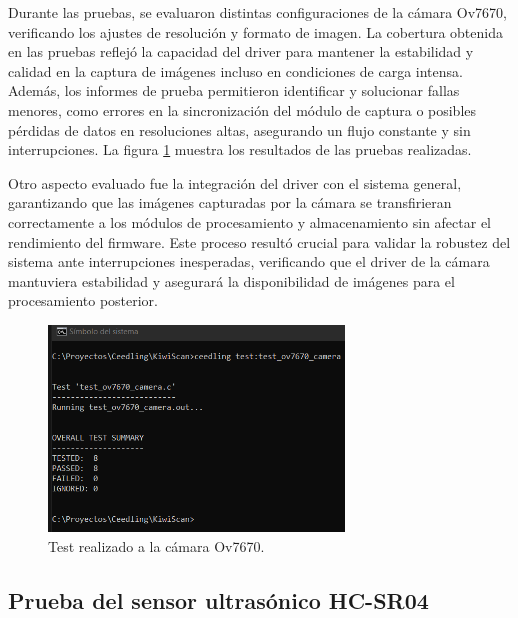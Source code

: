 Durante las pruebas, se evaluaron distintas configuraciones de la cámara Ov7670, verificando los ajustes de resolución y formato de imagen. La cobertura obtenida en las pruebas reflejó la capacidad del driver para mantener la estabilidad y calidad en la captura de imágenes incluso en condiciones de carga intensa. Además, los informes de prueba permitieron identificar y solucionar fallas menores, como errores en la sincronización del módulo de captura o posibles pérdidas de datos en resoluciones altas, asegurando un flujo constante y sin interrupciones. La figura \ref{fig:test_ov7670_camera}
muestra los resultados de las pruebas realizadas.

Otro aspecto evaluado fue la integración del driver con el sistema general, garantizando que las imágenes capturadas por la cámara se transfirieran correctamente a los módulos de procesamiento y almacenamiento sin afectar el rendimiento del firmware. Este proceso resultó crucial para validar la robustez del sistema ante interrupciones inesperadas, verificando que el driver de la cámara mantuviera estabilidad y asegurará la disponibilidad de imágenes para el procesamiento posterior.

\vspace{1cm}

\begin{figure}[htbp]
	\centering
	\includegraphics[width=0.7\textwidth, height=0.3\textheight]{./Figures/test_ov7670_camera.png}
	\caption{Test realizado a la cámara Ov7670.}
	\label{fig:test_ov7670_camera}
\end{figure}

\vspace{1cm}

\subsection{Prueba del sensor ultrasónico HC-SR04}

